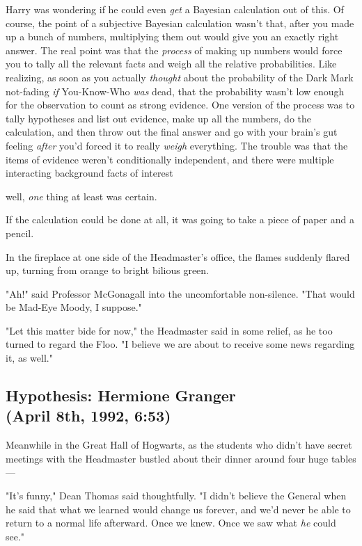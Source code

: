 Harry was wondering if he could even \emph{get} a Bayesian calculation out of
this. Of course, the point of a subjective Bayesian calculation wasn't that,
after you made up a bunch of numbers, multiplying them out would give you an
exactly right answer. The real point was that the \emph{process} of making up
numbers would force you to tally all the relevant facts and weigh all the
relative probabilities. Like realizing, as soon as you actually \emph{thought}
about the probability of the Dark Mark not-fading \emph{if} You-Know-Who
\emph{was} dead, that the probability wasn't low enough for the observation to
count as strong evidence. One version of the process was to tally hypotheses
and list out evidence, make up all the numbers, do the calculation, and then
throw out the final answer and go with your brain's gut feeling \emph{after}
you'd forced it to really \emph{weigh} everything. The trouble was that the
items of evidence weren't conditionally independent, and there were multiple
interacting background facts of interest{\el}

{\el} well, \emph{one} thing at least was certain.

If the calculation could be done at all, it was going to take a piece of paper
and a pencil.

In the fireplace at one side of the Headmaster's office, the flames suddenly
flared up, turning from orange to bright bilious green.

"Ah!" said Professor McGonagall into the uncomfortable non-silence. "That would
be Mad-Eye Moody, I suppose."

"Let this matter bide for now," the Headmaster said in some relief, as he too
turned to regard the Floo. "I believe we are about to receive some news
regarding it, as well."
\sbreak
\vspace{-2\baselineskip}
\subsection{Hypothesis: Hermione Granger\\
(April 8th, 1992, 6:53\PM)}

Meanwhile in the Great Hall of Hogwarts, as the students who didn't have secret
meetings with the Headmaster bustled about their dinner around four huge
tables—

"It's funny," Dean Thomas said thoughtfully. "I didn't believe the General when
he said that what we learned would change us forever, and we'd never be able to
return to a normal life afterward. Once we knew. Once we saw what \emph{he}
could see."

